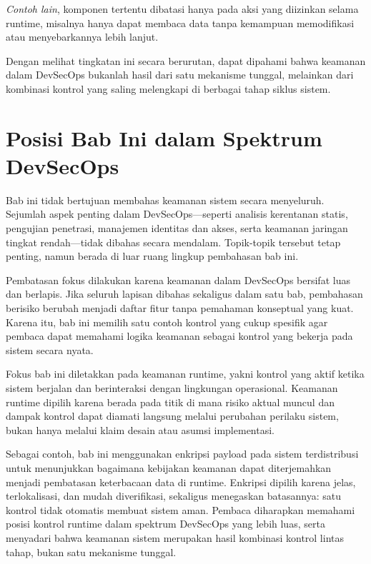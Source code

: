 \emph{Contoh lain}, komponen tertentu dibatasi hanya pada aksi yang diizinkan selama runtime, misalnya hanya dapat membaca data tanpa kemampuan memodifikasi atau menyebarkannya lebih lanjut.

Dengan melihat tingkatan ini secara berurutan, dapat dipahami bahwa keamanan dalam DevSecOps bukanlah hasil dari satu mekanisme tunggal, melainkan dari kombinasi kontrol yang saling melengkapi di berbagai tahap siklus sistem.


\section{Posisi Bab Ini dalam Spektrum DevSecOps}

Bab ini tidak bertujuan membahas keamanan sistem secara menyeluruh. Sejumlah aspek penting dalam DevSecOps---seperti analisis kerentanan statis, pengujian penetrasi, manajemen identitas dan akses, serta keamanan jaringan tingkat rendah---tidak dibahas secara mendalam. Topik-topik tersebut tetap penting, namun berada di luar ruang lingkup pembahasan bab ini.

Pembatasan fokus dilakukan karena keamanan dalam DevSecOps bersifat luas dan berlapis. Jika seluruh lapisan dibahas sekaligus dalam satu bab, pembahasan berisiko berubah menjadi daftar fitur tanpa pemahaman konseptual yang kuat. Karena itu, bab ini memilih satu contoh kontrol yang cukup spesifik agar pembaca dapat memahami logika keamanan sebagai kontrol yang bekerja pada sistem secara nyata.

Fokus bab ini diletakkan pada keamanan runtime, yakni kontrol yang aktif ketika sistem berjalan dan berinteraksi dengan lingkungan operasional. Keamanan runtime dipilih karena berada pada titik di mana risiko aktual muncul dan dampak kontrol dapat diamati langsung melalui perubahan perilaku sistem, bukan hanya melalui klaim desain atau asumsi implementasi.

Sebagai contoh, bab ini menggunakan enkripsi payload pada sistem terdistribusi untuk menunjukkan bagaimana kebijakan keamanan dapat diterjemahkan menjadi pembatasan keterbacaan data di runtime. Enkripsi dipilih karena jelas, terlokalisasi, dan mudah diverifikasi, sekaligus menegaskan batasannya: satu kontrol tidak otomatis membuat sistem aman. Pembaca diharapkan memahami posisi kontrol runtime dalam spektrum DevSecOps yang lebih luas, serta menyadari bahwa keamanan sistem merupakan hasil kombinasi kontrol lintas tahap, bukan satu mekanisme tunggal.



